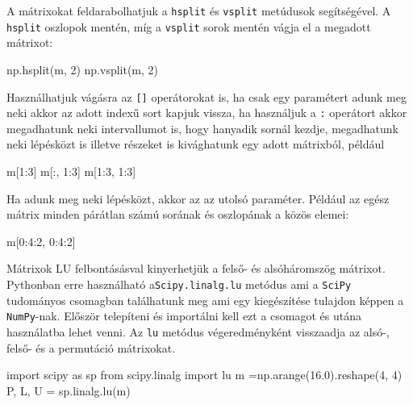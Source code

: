     A mátrixokat feldarabolhatjuk a \texttt{hsplit} és \texttt{vsplit}
metúdusok segítségével. A \texttt{hsplit} oszlopok mentén, míg a
\texttt{vsplit} sorok mentén vágja el a megadott mátrixot:
\begin{python}
np.hsplit(m, 2)
np.vsplit(m, 2)
\end{python}
    Használhatjuk vágásra az \texttt{{[}{]}} operátorokat is, ha csak egy
paramétert adunk meg neki akkor az adott indexű sort kapjuk vissza, ha
használjuk a \texttt{:} operátort akkor megadhatunk neki intervallumot
is, hogy hanyadik sornál kezdje, megadhatunk neki lépésközt is illetve
részeket is kivághatunk egy adott mátrixból, például
\begin{python}
m[1:3]
m[:, 1:3]
m[1:3, 1:3]
\end{python}
    Ha adunk meg neki lépésközt, akkor az az utolsó paraméter. Például az egész
mátrix minden párátlan számú sorának és oszlopának a közös elemei:
\begin{python}
m[0:4:2, 0:4:2]
\end{python}


    
    Mátrixok LU felbontásásval kinyerhetjük a felső-  és alsóháromszög
mátrixot. Pythonban erre használható a\texttt{Scipy.linalg.lu} metódus
ami a \texttt{SciPy} tudományos csomagban találhatunk meg ami egy
kiegészítése tulajdon képpen a \texttt{NumPy}-nak. Először telepíteni és
importálni kell ezt a csomagot és utána használatba lehet venni. Az
\texttt{lu} metódus végeredményként visszaadja az alsó-, felső- és a
permutáció mátrixokat.
\begin{python}
import scipy as sp
from scipy.linalg import lu
m =np.arange(16.0).reshape(4, 4)
P, L, U = sp.linalg.lu(m)
\end{python}


